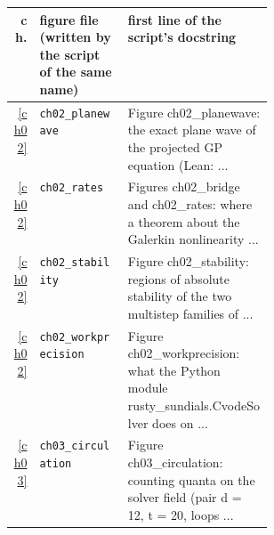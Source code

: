 \begin{center}\footnotesize\setlength{\tabcolsep}{3pt}\begin{tabularx}{\linewidth}{@{}r>{\raggedright}p{0.34\linewidth}>{\raggedright\arraybackslash}X@{}}\toprule ch. & figure file (written by the script of the same name) & first line of the script's docstring\\\midrule
\ref{ch02} & \texttt{ch02\_\allowbreak{}planewave} & Figure ch02\_\allowbreak{}planewave: the exact plane wave of the projected GP equation (Lean: .\allowbreak{}.\allowbreak{}.\allowbreak{} \\
\ref{ch02} & \texttt{ch02\_\allowbreak{}rates} & [script \texttt{ch02\_\allowbreak{}bridge.\allowbreak{}py}] Figures ch02\_\allowbreak{}bridge and ch02\_\allowbreak{}rates: where a theorem about the Galerkin nonlinearity .\allowbreak{}.\allowbreak{}.\allowbreak{} \\
\ref{ch02} & \texttt{ch02\_\allowbreak{}stability} & Figure ch02\_\allowbreak{}stability: regions of absolute stability of the two multistep families of .\allowbreak{}.\allowbreak{}.\allowbreak{} \\
\ref{ch02} & \texttt{ch02\_\allowbreak{}workprecision} & Figure ch02\_\allowbreak{}workprecision: what the Python module rusty\_\allowbreak{}sundials.\allowbreak{}CvodeSolver does on .\allowbreak{}.\allowbreak{}.\allowbreak{} \\
\ref{ch03} & \texttt{ch03\_\allowbreak{}circulation} & Figure ch03\_\allowbreak{}circulation: counting quanta on the solver field (pair d = 12,\allowbreak{} t = 20,\allowbreak{} loops .\allowbreak{}.\allowbreak{}.\allowbreak{} \\
\bottomrule\end{tabularx}\end{center}
